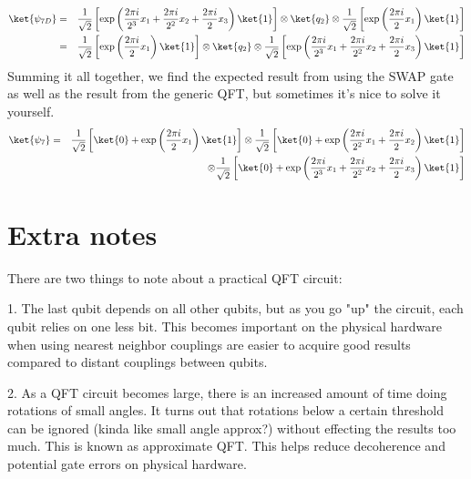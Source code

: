 \documentclass[preprint,aps,prd,nofootinbib,superscriptaddress]{revtex4-2}
\begin{document}
%
\begin{eqnarray} 
\ket{\psi_{7D}} &=& \frac{1}{\sqrt{2}} \left[ \exp\left(\frac{2\pi i}{2^3} x_1 + \frac{2\pi i}{2^2} x_2 + \frac{2\pi i}{2} x_3 \right)\ket{1} \right] 
\otimes \ket{q_2}
\otimes \frac{1}{\sqrt{2}} \left[\exp\left(\frac{2\pi i}{2} x_1 \right)\ket{1} \right]
\nonumber \\
&=& \frac{1}{\sqrt{2}} \left[\exp\left(\frac{2\pi i}{2} x_1 \right) \ket{1} \right] 
\otimes \ket{q_2}
\otimes \frac{1}{\sqrt{2}} \left[\exp\left(\frac{2\pi i}{2^3} x_1 + \frac{2\pi i}{2^2} x_2 + \frac{2\pi i}{2} x_3 \right)\ket{1} \right]
\nonumber \\
\end{eqnarray}
%
Summing it all together, we find the expected result from using the SWAP gate as well as the result from the generic QFT, but sometimes it's nice to solve it yourself.
%
\begin{eqnarray} 
\ket{\psi_{7}} &=& \frac{1}{\sqrt{2}} \left[\ket{0} + \exp\left(\frac{2\pi i}{2} x_1 \right)\ket{1} \right]  \otimes \frac{1}{\sqrt{2}} \left[\ket{0} + \exp\left(\frac{2\pi i}{2^2} x_1 + \frac{2\pi i}{2} x_2 \right) \ket{1} \right]
\nonumber \\
&& \quad \quad \quad \otimes 
\frac{1}{\sqrt{2}} \left[\ket{0} + \exp\left(\frac{2\pi i}{2^3} x_1 + \frac{2\pi i}{2^2} x_2 + \frac{2\pi i}{2} x_3 \right)\ket{1}\right]
\end{eqnarray}
%

\section{Extra notes}
%
There are two things to note about a practical QFT circuit:
%

%
1. The last qubit depends on all other qubits, but as you go "up" the circuit, each qubit relies on one less bit. This becomes important on the physical hardware when using nearest neighbor couplings are easier to acquire good results compared to distant couplings between qubits.
%

%
2. As a QFT circuit becomes large, there is an increased amount of time doing rotations of small angles. It turns out that rotations below a certain threshold can be ignored (kinda like small angle approx?) without effecting the results too much. This is known as approximate QFT. This helps reduce decoherence and potential gate errors on physical hardware.
%


\begin{thebibliography}{99}



\end{thebibliography}
\end{document}
